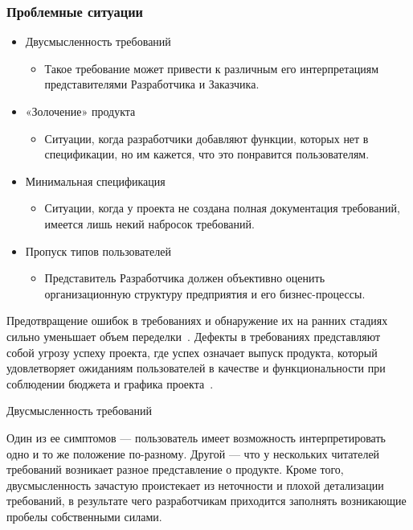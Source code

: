 \documentclass{../industrial-development}
\begin{document}
{\begin{frame} \frametitle {Проблемные ситуации}
\begin{itemize}
\item \alert{Двусмысленность требований}
\begin{itemize}
\item Такое требование может привести к различным его интерпретациям представителями Разработчика и Заказчика.
\end{itemize}
\item \alert{«Золочение» продукта}
\begin{itemize}
\item Ситуации, когда разработчики добавляют функции, которых нет в спецификации, но им кажется, что это понравится пользователям.
\end{itemize}
\item \alert{Минимальная спецификация}
\begin{itemize}
\item Ситуации, когда у проекта не создана полная документация требований, имеется лишь некий набросок требований.
\end{itemize}
\item \alert{Пропуск типов пользователей}
\begin{itemize}
\item Представитель Разработчика должен объективно оценить организационную структуру предприятия и его бизнес-процессы.
\end{itemize}
\end{itemize}
\end{frame}

\lecturenotes

Предотвращение ошибок в требованиях и обнаружение их на ранних стадиях сильно уменьшает объем переделки~\cite[с.~16]{Wiegers}. Дефекты в требованиях представляют собой угрозу успеху проекта, где успех означает выпуск продукта, который удовлетворяет ожиданиям пользователей в качестве и функциональности при соблюдении бюджета и графика проекта~\cite[с.~17]{Wiegers}.

\alert{Двусмысленность требований}

Один из ее симптомов — пользователь имеет возможность интерпретировать одно и то же положение по-разному. Другой — что у нескольких читателей требований возникает разное
представление о продукте. Кроме того, двусмысленность зачастую
проистекает из неточности и плохой детализации требований, в результате чего разработчикам приходится заполнять возникающие
пробелы собственными силами.

}
\end{document}
